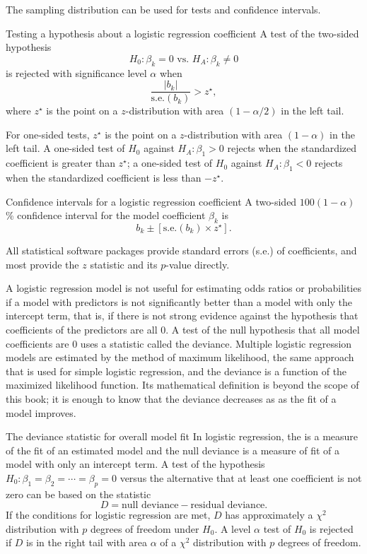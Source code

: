 The sampling distribution can be used for tests and confidence intervals.

\begin{onebox}{Testing a hypothesis about a logistic regression coefficient}
A test of the two-sided hypothesis
\[
  H_0: \beta_k = 0 \text{ vs. } H_A: \beta_k \ne 0
\]
is rejected with significance level $\alpha$ when
\[
     \frac{|b_k|}{\textrm{s.e.}(b_k)} > z^\star,
\]
where $z^\star$ is the point on a $z$-distribution with area $(1 - \alpha/2)$ in the left tail.
\end{onebox}

For one-sided tests, $z^\star$ is the point on a $z$-distribution with area $(1 - \alpha)$ in the left tail. A one-sided test of $H_0$ against $H_A: \beta_1 > 0$ rejects when the standardized coefficient is greater than  $ z^\star$; a one-sided test of $H_0$ against $H_A: \beta_1 < 0$  rejects when the standardized coefficient is less than $-z^\star$.

\begin{onebox}{Confidence intervals for a logistic regression coefficient}
A two-sided $100(1 - \alpha)$\% confidence interval for the model coefficient $\beta_k$ is
\[
  b_k \pm [{\textrm{s.e.}(b_k)} \times z^\star].
\]
\end{onebox}

All statistical software packages provide standard errors (s.e.) of coefficients, and most provide the $z$ statistic and its $p$-value directly.

A logistic regression model is not useful for estimating odds ratios or probabilities if a model with predictors is not significantly better than a model with only the intercept term, that is, if there is not strong evidence against the hypothesis that coefficients of the predictors are all 0.  A test of the null hypothesis that all model coefficients are 0  uses a statistic called the deviance. Multiple logistic regression models are estimated by the method of maximum likelihood, the same approach that is used for simple logistic regression, and the deviance is a function of the maximized likelihood function.  Its mathematical definition is beyond the scope of this book; it is enough to know that the deviance decreases as as the fit of a model improves.

\begin{onebox}{The deviance statistic for overall model fit}
  In logistic regression, the  is a measure of the fit of an estimated model and the null deviance is a measure of fit of a model with only an intercept term. A test of the hypothesis $H_0:\beta_1 = \beta_2 = \cdots = \beta_p = 0$ versus the alternative that at least one coefficient is not zero can be based on the statistic
  \[
    D =  \text{null deviance} - \text{residual deviance}.
  \]
  If the conditions for logistic regression are met, $D$ has approximately a $\chi^2$ distribution with $p$ degrees of freedom under $H_0$.  A level $\alpha$ test of $H_0$ is rejected if $D$ is in the right tail with area $\alpha$ of a $\chi^2$ distribution with $p$ degrees of freedom.
\end{onebox}

